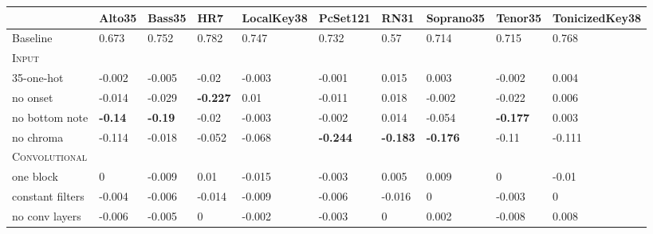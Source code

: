 \begin{tabular}{llllllllll}
                                & Alto35         & Bass35         & HR7             & LocalKey38      & PcSet121        & RN31            & Soprano35       & Tenor35         & TonicizedKey38  \\
\hline
Baseline                        & 0.673          & 0.752          & 0.782           & 0.747           & 0.732           & 0.57            & 0.714           & 0.715           & 0.768           \\
\hline
\textsc{Input}                  &                &                &                 &                 &                 &                 &                 &                 &                 \\
35-one-hot                      & -0.002         & -0.005         & -0.02           & -0.003          & -0.001          & 0.015           & 0.003           & -0.002          & 0.004           \\
no onset                        & -0.014         & -0.029         & \textbf{-0.227} & 0.01            & -0.011          & 0.018           & -0.002          & -0.022          & 0.006           \\
no bottom note                  & \textbf{-0.14} & \textbf{-0.19} & -0.02           & -0.003          & -0.002          & 0.014           & -0.054          & \textbf{-0.177} & 0.003           \\
no chroma                       & -0.114         & -0.018         & -0.052          & -0.068          & \textbf{-0.244} & \textbf{-0.183} & \textbf{-0.176} & -0.11           & -0.111          \\
\hline
\textsc{Convolutional}                    &                &                &                 &                 &                 &                 &                 &                 &                 \\
one block                       & 0              & -0.009         & 0.01            & -0.015          & -0.003          & 0.005           & 0.009           & 0               & -0.01           \\
constant filters                & -0.004         & -0.006         & -0.014          & -0.009          & -0.006          & -0.016          & 0               & -0.003          & 0               \\
no conv layers                  & -0.006         & -0.005         & 0               & -0.002          & -0.003          & 0               & 0.002           & -0.008          & 0.008           \\

\end{tabular}
